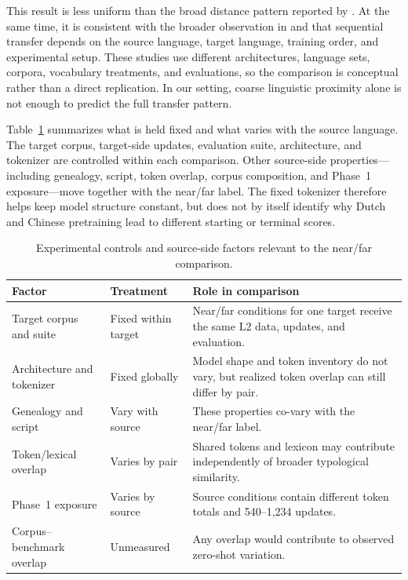 \documentclass[11pt]{article}
\begin{document}
This result is less uniform than the broad distance pattern reported by \citet{yadavalli-etal-2023-slabert}. At the same time, it is consistent with the broader observation in \citet{oba-etal-2023-second} and \citet{gogoulou-etal-2024-continual-clean} that sequential transfer depends on the source language, target language, training order, and experimental setup. These studies use different architectures, language sets, corpora, vocabulary treatments, and evaluations, so the comparison is conceptual rather than a direct replication. In our setting, coarse linguistic proximity alone is not enough to predict the full transfer pattern.

Table~\ref{tab:diagnostic-status} summarizes what is held fixed and what varies with the source language. The target corpus, target-side updates, evaluation suite, architecture, and tokenizer are controlled within each comparison. Other source-side properties---including genealogy, script, token overlap, corpus composition, and Phase~1 exposure---move together with the near/far label. The fixed tokenizer therefore helps keep model structure constant, but does not by itself identify why Dutch and Chinese pretraining lead to different starting or terminal scores.

\begin{table}[tb]
\centering
\small
\begin{tabular}{p{}p{}p{}}
\hline
\textbf{Factor} & \textbf{Treatment} & \textbf{Role in comparison} \\ \hline
Target corpus and suite & Fixed within target & Near/far conditions for one target receive the same L2 data, updates, and evaluation. \\
Architecture and tokenizer & Fixed globally & Model shape and token inventory do not vary, but realized token overlap can still differ by pair. \\
Genealogy and script & Vary with source & These properties co-vary with the near/far label. \\
Token/lexical overlap & Varies by pair & Shared tokens and lexicon may contribute independently of broader typological similarity. \\
Phase~1 exposure & Varies by source & Source conditions contain different token totals and 540--1,234 updates. \\
Corpus--benchmark overlap & Unmeasured & Any overlap would contribute to observed zero-shot variation. \\ \hline
\end{tabular}
\caption{Experimental controls and source-side factors relevant to the near/far comparison.}
\label{tab:diagnostic-status}
\end{table}
\end{document}
